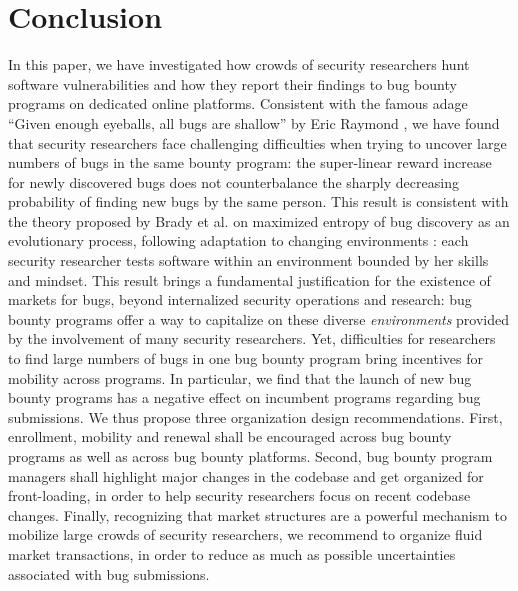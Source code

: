 \section{Conclusion}
\label{sec:conclusion}
In this paper, we have investigated how crowds of security researchers hunt software vulnerabilities and how they report their findings to bug bounty programs on dedicated online platforms. Consistent with the famous adage ``Given enough eyeballs, all bugs are shallow'' by Eric Raymond \cite{raymond1999cathedral}, we have found that security researchers face challenging difficulties when trying to uncover large numbers of bugs in the same bounty program: the super-linear reward increase for newly discovered bugs does not counterbalance the sharply decreasing probability of finding new bugs by the same person. This result is consistent with the theory proposed by Brady et al. on maximized entropy of bug discovery as an evolutionary process, following adaptation to changing environments \cite{brady1999murphy}: each security researcher tests software within an environment bounded by her skills and mindset. This result brings a fundamental justification for the existence of markets for bugs, beyond internalized security operations and research: bug bounty programs offer a way to capitalize on these diverse {\it environments} provided by the involvement of many security researchers. Yet, difficulties for researchers to find large numbers of bugs in one bug bounty program bring incentives for mobility across programs. In particular, we find that the launch of new bug bounty programs has a negative effect on incumbent programs regarding bug submissions. We thus propose three organization design recommendations. First, enrollment, mobility and renewal shall be encouraged across bug bounty programs as well as across bug bounty platforms. Second, bug bounty program managers shall highlight major changes in the codebase and get organized for front-loading, in order to help security researchers focus on recent codebase changes. Finally, recognizing that market structures are a powerful mechanism to mobilize large crowds of security researchers, we recommend to organize fluid market transactions, in order to reduce as much as possible uncertainties associated with bug submissions.



